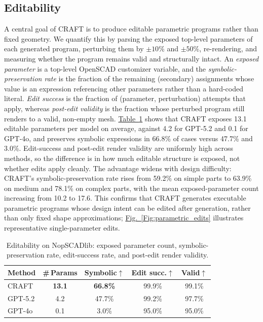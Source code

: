 \documentclass[conference]{IEEEtran}
\newcommand{\colref}[2]{\hyperref[#2]{#1~\ref*{#2}}}
\newcommand{\figref}[1]{\colref{Fig.}{#1}}
\newcommand{\tabref}[1]{\colref{Table}{#1}}
\begin{document}
\subsection{Editability}
\label{subsec:edit}

A central goal of CRAFT is to produce editable parametric programs rather than fixed geometry. We quantify this by parsing the exposed top-level parameters of each generated program, perturbing them by $\pm10\%$ and $\pm50\%$, re-rendering, and measuring whether the program remains valid and structurally intact. An \emph{exposed parameter} is a top-level OpenSCAD customizer variable, and the \emph{symbolic-preservation rate} is the fraction of the remaining (secondary) assignments whose value is an expression referencing other parameters rather than a hard-coded literal. \emph{Edit success} is the fraction of (parameter, perturbation) attempts that apply, whereas \emph{post-edit validity} is the fraction whose perturbed program still renders to a valid, non-empty mesh. \tabref{tab:edit} shows that CRAFT exposes 13.1 editable parameters per model on average, against 4.2 for GPT-5.2 and 0.1 for GPT-4o, and preserves symbolic expressions in 66.8\% of cases versus 47.7\% and 3.0\%. Edit-success and post-edit render validity are uniformly high across methods, so the difference is in how much editable structure is exposed, not whether edits apply cleanly. The advantage widens with design difficulty: CRAFT's symbolic-preservation rate rises from 59.2\% on simple parts to 63.9\% on medium and 78.1\% on complex parts, with the mean exposed-parameter count increasing from 10.2 to 17.6. This confirms that CRAFT generates executable parametric programs whose design intent can be edited after generation, rather than only fixed shape approximations; \figref{Fig:parametric_edits} illustrates representative single-parameter edits.

\begin{table}[t]
\centering
\caption{Editability on NopSCADlib: exposed parameter count, symbolic-preservation rate, edit-success rate, and post-edit render validity.}
\label{tab:edit}
\small
\setlength{\tabcolsep}{5pt}
\begin{tabular}{lcccc}
\toprule
Method & \#\,Params & Symbolic$\uparrow$ & Edit succ.$\uparrow$ & Valid$\uparrow$ \\
\midrule
CRAFT   & \textbf{13.1} & \textbf{66.8\%} & 99.9\% & 99.1\% \\
GPT-5.2 & 4.2  & 47.7\% & 99.2\% & 97.7\% \\
GPT-4o  & 0.1  & 3.0\%  & 95.0\% & 95.0\% \\
\bottomrule
\end{tabular}
\end{table}
\end{document}
